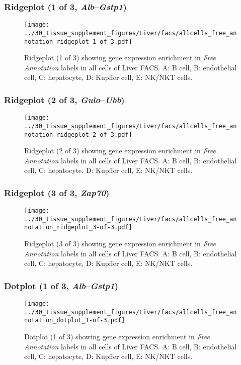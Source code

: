 \clearpage

\subsubsection{Ridgeplot (1 of 3, \emph{Alb}--\emph{Gstp1})}
\begin{figure}[h]
\centering
\texttt{[image: ../30\_tissue\_supplement\_figures/Liver/facs/allcells\_free\_annotation\_ridgeplot\_1-of-3.pdf]}

\caption{ Ridgeplot (1 of 3)  showing gene expression enrichment in \emph{Free Annotation} labels in all cells of Liver FACS. A: B cell, B: endothelial cell, C: hepatocyte, D: Kupffer cell, E: NK/NKT cells.}
\end{figure}


\clearpage

\subsubsection{Ridgeplot (2 of 3, \emph{Gulo}--\emph{Ubb})}
\begin{figure}[h]
\centering
\texttt{[image: ../30\_tissue\_supplement\_figures/Liver/facs/allcells\_free\_annotation\_ridgeplot\_2-of-3.pdf]}

\caption{ Ridgeplot (2 of 3)  showing gene expression enrichment in \emph{Free Annotation} labels in all cells of Liver FACS. A: B cell, B: endothelial cell, C: hepatocyte, D: Kupffer cell, E: NK/NKT cells.}
\end{figure}


\clearpage

\subsubsection{Ridgeplot (3 of 3, \emph{Zap70})}
\begin{figure}[h]
\centering
\texttt{[image: ../30\_tissue\_supplement\_figures/Liver/facs/allcells\_free\_annotation\_ridgeplot\_3-of-3.pdf]}

\caption{ Ridgeplot (3 of 3)  showing gene expression enrichment in \emph{Free Annotation} labels in all cells of Liver FACS. A: B cell, B: endothelial cell, C: hepatocyte, D: Kupffer cell, E: NK/NKT cells.}
\end{figure}


\clearpage

\subsubsection{Dotplot (1 of 3, \emph{Alb}--\emph{Gstp1})}
\begin{figure}[h]
\centering
\texttt{[image: ../30\_tissue\_supplement\_figures/Liver/facs/allcells\_free\_annotation\_dotplot\_1-of-3.pdf]}

\caption{ Dotplot (1 of 3)  showing gene expression enrichment in \emph{Free Annotation} labels in all cells of Liver FACS. A: B cell, B: endothelial cell, C: hepatocyte, D: Kupffer cell, E: NK/NKT cells.}
\end{figure}


